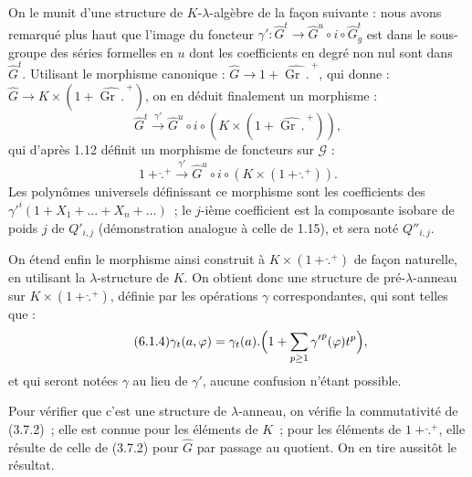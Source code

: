 
On le
munit d'une structure de \(K\)-\(\lambda\)-algèbre de la façon suivante : nous avons remarqué plus haut que l'image du foncteur \(\gamma'\colon\widehat G^t\longrightarrow\widehat G^u\circ i\circ\widehat G^t_g\) est dans le sous-groupe des séries formelles en \(u\) dont les coefficients en degré non nul sont dans \(\widehat G^t\). Utilisant le morphisme canonique : \(\widehat G\longrightarrow 1+\widehat{\operatorname{Gr}\,\mathord{.}\,}^{+}\), qui donne : \(\widehat G\longrightarrow K\times(1+\widehat{\operatorname{Gr}\,\mathord{.}\,}^{+})\), on en déduit finalement un morphisme :
\[
  \widehat G^t\xrightarrow{\gamma'}\widehat G^u\circ i\circ(K\times(1+\widehat{\operatorname{Gr}\,\mathord{.}\,}^{+})),
\]
qui d'après 1.12 définit un morphisme de foncteurs sur \(\mathcal G\) :
\[
  1+\widehat{\mathord{.}}{}^{+}\xrightarrow{\gamma'}\widehat G^u\circ i\circ(K\times(1+\widehat{\mathord{.}}{}^{+})).
\]
Les polynômes universels définissant ce morphisme sont les coefficients des \({\gamma'}^{i}(1+X_1+\ldots+X_n+\ldots)\)~; le \(j\)-ième coefficient est la composante isobare de poids \(j\) de \(Q'_{i,j}\) (démonstration analogue à celle de 1.15), et sera noté \(Q''_{i,j}\).

On étend enfin le morphisme ainsi construit à \(K\times(1+\widehat{\mathord{.}}{}^{+})\) de façon naturelle, en utilisant la \(\lambda\)-structure de \(K\). On obtient donc une structure de pré-\(\lambda\)-anneau sur \(K\times(1+\widehat{\mathord{.}}{}^{+})\), définie par les opérations \(\gamma\) correspondantes, qui sont telles que :
\begin{equation}\tag{6.1.4}
  \gamma_t(a,\varphi)=\gamma_t(a).\Bigl(1+\sum_{p\ge1}{\gamma'}^{p}(\varphi)t^{p}\Bigr),
\end{equation}
et qui seront notées \(\gamma\) au lieu de \(\gamma'\), aucune confusion n'étant possible.

Pour vérifier que c'est une structure de \(\lambda\)-anneau, on vérifie la commutativité de (3.7.2)~; elle est connue pour les éléments de \(K\)~; pour les éléments de \(1+\widehat{\mathord{.}}{}^{+}\), elle résulte de celle de (3.7.2) pour \(\widehat G\) par passage au quotient. On en tire aussitôt le résultat.



\providecommand{\Ghat}{\widehat G}
\providecommand{\Aqhat}{\widehat A_{\mathbb Q}}
\providecommand{\Ch}{\operatorname{Ch}}
\providecommand{\Log}{\operatorname{Log}}
\renewcommand{\id}{\operatorname{id}}
\providecommand{\gr}{\operatorname{gr}}
\providecommand{\Hom}{\operatorname{Hom}}
\providecommand{\epsi}{\varepsilon}
\providecommand{\clgr}{\operatorname{cl}}
\providecommand{\Fil}{\operatorname{Fil}}
\providecommand{\Gr}{\operatorname{Gr}}
\providecommand{\Sym}{\operatorname{Sym}}


